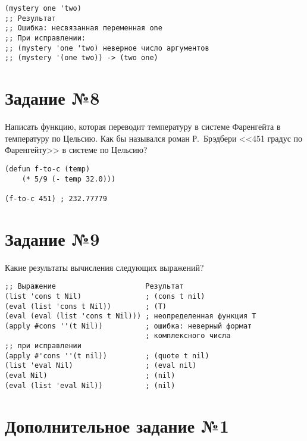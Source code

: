 \vspace{4mm}
\begin{minipage}{0.92\linewidth}
\begin{lstlisting}
(mystery one 'two)
;; Результат
;; Ошибка: несвязанная переменная one
;; При исправлении:
;; (mystery 'one 'two) неверное число аргументов
;; (mystery '(one two)) -> (two one)
\end{lstlisting}
\end{minipage}

\section{Задание №8}

Написать функцию, которая переводит температуру в системе Фаренгейта в
температуру по Цельсию.
Как бы назывался роман Р.~Брэдбери <<451 градус по Фаренгейту>> в системе по Цельсию?

\vspace{4mm}
\begin{minipage}{0.92\linewidth}
\begin{lstlisting}
(defun f-to-c (temp) 
    (* 5/9 (- temp 32.0)))

(f-to-c 451) ; 232.77779
\end{lstlisting}
\end{minipage}

\section{Задание №9}

Какие результаты вычисления следующих выражений?

\vspace{4mm}
\begin{minipage}{0.92\linewidth}
\begin{lstlisting}
;; Выражение                     Результат
(list 'cons t Nil)               ; (cons t nil)
(eval (list 'cons t Nil))        ; (T)
(eval (eval (list 'cons t Nil))) ; неопределенная функция T 
(apply #cons ''(t Nil))          ; ошибка: неверный формат
                                 ; комплексного числа
;; при исправлении
(apply #'cons ''(t nil))         ; (quote t nil)
(list 'eval Nil)                 ; (eval nil)
(eval Nil)                       ; (nil)
(eval (list 'eval Nil))          ; (nil)
\end{lstlisting}
\end{minipage}

\section{Дополнительное задание №1}

